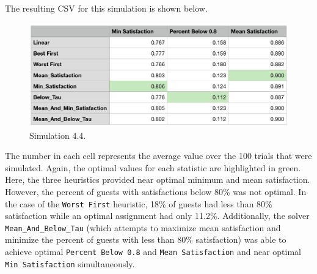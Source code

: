 \documentclass[11 pt]{article}
\begin{document}
The resulting CSV for this simulation is shown below.
\begin{figure}[H]
    \begin{center}
  \includegraphics[scale=0.55]{images/sim3CSV.png}
  \caption{Simulation 4.4.}
  \end{center}
\end{figure}
\vspace{-0.5cm}
\par The number in each cell represents the average value over the 100 trials that were simulated. Again, the optimal values for each statistic are highlighted in green. Here, the three heuristics provided near optimal minimum and mean satisfaction. However, the percent of guests with satisfactions below 80\% was not optimal. In the case of the \texttt{Worst First} heuristic, 18\% of guests had less than 80\% satisfaction while an optimal assignment had only 11.2\%. Additionally, the solver \texttt{Mean\_And\_Below\_Tau} (which attempts to maximize mean satisfaction and minimize the percent of guests with less than 80\% satisfaction) was able to achieve optimal \texttt{Percent Below 0.8} and \texttt{Mean Satisfaction} and near optimal \texttt{Min Satisfaction} simultaneously.
\end{document}
